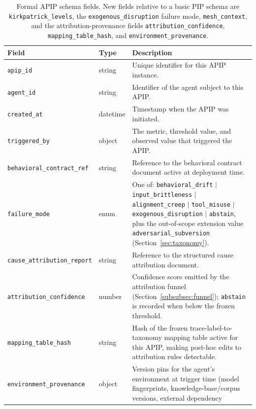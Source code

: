\documentclass[conference]{IEEEtran}
\begin{document}
\begin{table}[t]
  \centering
  \caption{Formal APIP schema fields. New fields relative to a basic PIP
           schema are \texttt{kirkpatrick\_levels}, the
           \texttt{exogenous\_disruption} failure mode,
           \texttt{mesh\_context}, and the attribution-provenance fields
           \texttt{attribution\_confidence}, \texttt{mapping\_table\_hash},
           and \texttt{environment\_provenance}.}
  \label{tab:schema}
  \footnotesize
  \begin{tabular}{@{}L{4.2cm}L{1.8cm}L{10.4cm}@{}}
    \toprule
    \textbf{Field} & \textbf{Type} & \textbf{Description} \\
    \midrule
    \texttt{apip\_id} & string &
      Unique identifier for this APIP instance. \\
    \texttt{agent\_id} & string &
      Identifier of the agent subject to this APIP. \\
    \texttt{created\_at} & datetime &
      Timestamp when the APIP was initiated. \\
    \texttt{triggered\_by} & object &
      The metric, threshold value, and observed value that triggered
      the APIP. \\
    \texttt{behavioral\_contract\_ref} & string &
      Reference to the behavioral contract document active at deployment
      time. \\
    \texttt{failure\_mode} & enum &
      One of: \texttt{behavioral\_drift} $|$ \texttt{input\_brittleness} $|$
      \texttt{alignment\_creep} $|$ \texttt{tool\_misuse} $|$
      \texttt{exogenous\_disruption} $|$ \texttt{abstain}, plus the
      out-of-scope extension value \texttt{adversarial\_subversion}
      (Section~\ref{sec:taxonomy}). \\
    \texttt{cause\_attribution\_report} & string &
      Reference to the structured cause attribution document. \\
    \texttt{attribution\_confidence} & number &
      Confidence score emitted by the attribution funnel
      (Section~\ref{subsubsec:funnel}); \texttt{abstain} is recorded when
      below the frozen threshold. \\
    \texttt{mapping\_table\_hash} & string &
      Hash of the frozen trace-label-to-taxonomy mapping table active for
      this APIP, making post-hoc edits to attribution rules detectable. \\
    \texttt{environment\_provenance} & object &
      Version pins for the agent's environment at trigger time (model
      fingerprints, knowledge-base/corpus versions, external dependency

\end{tabular}
\end{table}
\end{document}
